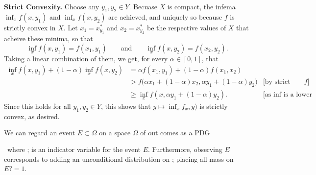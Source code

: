 
\textbf{Strict Convexity.}
Choose any $y_1, y_2 \in Y$. 
Becuase $X$ is compact, the infema $\inf_x f(x, y_1)$ and $\inf_x f(x, y_2)$ are achieved, and uniquely so because $f$ is strictly convex in $X$. Let $x_1 = x^*_{y_1}$ and $x_2 = x^*_{y_2}$ be the respective values of $X$ that acheive these minima, so that
\[ \inf_x f(x,y_1) = f(x_1, y_1) \qquad\text{and}\qquad \inf_x f(x,y_2) = f(x_2, y_2) .\]
Taking a linear combination of them, we get, for every $\alpha \in [0,1]$, that
\begin{align*}
    \inf_x f(x,y_1)+ (1-\alpha) \inf_x f(x,y_2) &= \alpha f(x_1,y_1) + (1-\alpha) f(x_1, x_2) & \\
    &> f\Big(\alpha  x_1 + (1-\alpha) x_2 , \alpha  y_1 + (1-\alpha) y_2 \Big)  & \text{[by strict convexity of $f$]}\\
    &\ge \inf_x f(x, \alpha  y_1 + (1-\alpha) y_2). & \text{[as $\inf$ is a lower bound]}
\end{align*}
Since this holds for all $y_1, y_2 \in Y$, this shows that $y \mapsto \inf_x f_x,y)$ is strictly convex, as desired.





We can regard an event $E \subset \Omega$ on a space $\Omega$ of out comes as a PDG
\, where  ; is an indicator variable for the event $E$. Furthermore, observing $E$ corresponds to adding an unconditional distribution on   ; placing all mass on $E? = 1$. 






